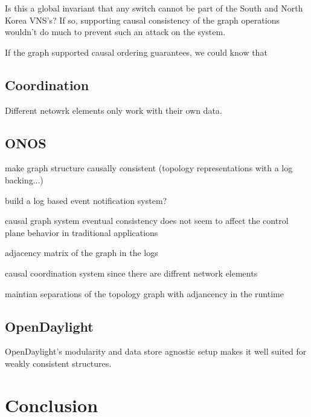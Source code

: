 \documentclass[letterpaper,twocolumn,10pt]{article}
\begin{document}
Is this a global invariant that any switch cannot be part of the South and North Korea VNS's? If so, supporting causal consistency of the graph operations wouldn't do much to prevent such an attack on the system.

If the graph supported causal ordering guarantees, we could know that 


\subsection{Coordination}

Different netowrk elements only work with their own data.

\subsection{ONOS}

make graph structure causally consistent (topology representations with a log backing...)

build a log based event notification system?

causal graph system
    eventual consistency does not seem to affect the control plane behavior in traditional applications

adjacency matrix of the graph in the logs

causal coordination system since there are diffrent network elements

maintian separations of the topology graph with adjancency in the runtime
\subsection{OpenDaylight}

OpenDaylight's modularity and data store agnostic setup makes it well suited for weakly consistent structures.

\section{Conclusion}



\end{document}
